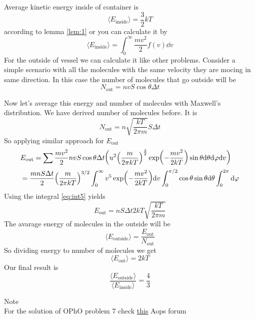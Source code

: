 \documentclass[a4paper, 12pt]{article}
\begin{document}
\begin{sol}
    Average kinetic energy inside of container is $$\langle E_{\text{inside}}\rangle=\frac{3}{2}kT$$ according to lemma \ref{lem:1} or you can calculate it by 
    $$\langle E_{\text{inside}}\rangle=\int_0^\infty\frac{mv^2}{2}f(v)\dd v$$
    For the outside of vessel we can calculate it like other problems. Consider a simple scenario with all the molecules with the same velocity they are mocing in same direction.
    In this case the number of molecules that go outside will be $$N_{\text{out}}=nvS\cos\theta\Delta t$$

    Now let's average this energy and number of molecules with Maxwell's distribution. We have derived number of molecules before. It is
    $$N_{\text{out}}=n\sqrt{\frac{kT}{2\pi m}}S\Delta t$$
    So applying similar approach for $E_{\text{out}}$
    \begin{align*}
        &E_{\text{out}}=\sum \frac{mv^2}{2}nvS\cos\theta\Delta t\qty(u^2\qty(\frac{m}{2\pi kT})^{\frac{3}{2}}\exp(-\frac{mv^2}{2kT})\sin\theta\dd\theta\dd\varphi\dd v)\\
        &=\frac{mnS\Delta t}{2}\qty(\frac{m}{2\pi kT})^{3/2}\int_0^\infty v^5\exp(-\frac{mv^2}{2kT})\dd v\int_0^{\pi/2}\cos\theta\sin\theta\dd\theta\int_0^{2\pi}\dd\varphi
    \end{align*}
    Using the integral \ref{eq:int5} yields
    $$E_{\text{out}}=nS\Delta t2kT\sqrt{\frac{kT}{2\pi m}}$$
    The avarage energy of molecules in the outside will be $$\langle E_{\text{outside}}\rangle=\frac{E_{\text{out}}}{N_{\text{out}}}$$
    So dividing energy to number of molecules we get $$\langle E_{\text{out}}\rangle=2kT$$
    Our final result is $$\frac{\langle E_{\text{outside}}\rangle}{\langle E_{\text{inside}}\rangle}=\frac{4}{3}$$
\end{sol}
Note\\
For the solution of OPhO problem 7 check \href{https://artofproblemsolving.com/community/c1222116_opho_invitational_round}{this} Aops forum 
\end{document}
